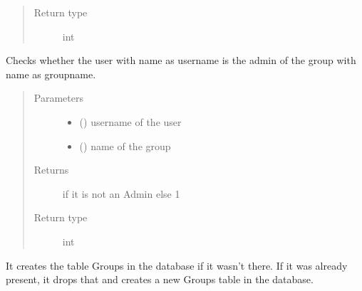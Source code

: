 \documentclass[letterpaper,10pt,english]{sphinxmanual}
\begin{document}
\begin{fulllineitems}
\begin{fulllineitems}
\begin{quote}
\begin{description}
\item[{Return type}] \leavevmode
int

\end{description}\end{quote}

\end{fulllineitems}


\begin{fulllineitems}
\label{\detokenize{sql:sql.Database.isAdmin}}
Checks whether the user with name as username is the admin of the group with name as groupname.
\begin{quote}\begin{description}
\item[{Parameters}] \leavevmode\begin{itemize}
\item {} 
 () \textendash{} username of the user

\item {} 
 () \textendash{} name of the group

\end{itemize}

\item[{Returns}]  if it is not an Admin else 1

\item[{Return type}] \leavevmode
int

\end{description}\end{quote}

\end{fulllineitems}


\begin{fulllineitems}
\label{\detokenize{sql:sql.Database.make_groups_table}}
It creates the table Groups in the database if it wasn’t there. If it was already present, it drops that and creates a new Groups table in the database.


\end{fulllineitems}
\end{fulllineitems}
\end{document}
